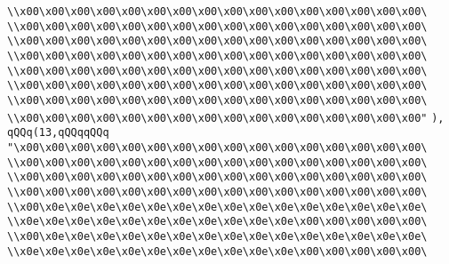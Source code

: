 \verb|\\x00\x00\x00\x00\x00\x00\x00\x00\x00\x00\x00\x00\x00\x00\x00\x00\|\newline
\verb|\\x00\x00\x00\x00\x00\x00\x00\x00\x00\x00\x00\x00\x00\x00\x00\x00\|\newline
\verb|\\x00\x00\x00\x00\x00\x00\x00\x00\x00\x00\x00\x00\x00\x00\x00\x00\|\newline
\verb|\\x00\x00\x00\x00\x00\x00\x00\x00\x00\x00\x00\x00\x00\x00\x00\x00\|\newline
\verb|\\x00\x00\x00\x00\x00\x00\x00\x00\x00\x00\x00\x00\x00\x00\x00\x00\|\newline
\verb|\\x00\x00\x00\x00\x00\x00\x00\x00\x00\x00\x00\x00\x00\x00\x00\x00\|\newline
\verb|\\x00\x00\x00\x00\x00\x00\x00\x00\x00\x00\x00\x00\x00\x00\x00\x00\|\newline
\verb|\\x00\x00\x00\x00\x00\x00\x00\x00\x00\x00\x00\x00\x00\x00\x00\x00"|\newline
\verb|),|\newline
\verb|qQQq(13,qQQqqQQq|\newline
\verb|"\x00\x00\x00\x00\x00\x00\x00\x00\x00\x00\x00\x00\x00\x00\x00\x00\|\newline
\verb|\\x00\x00\x00\x00\x00\x00\x00\x00\x00\x00\x00\x00\x00\x00\x00\x00\|\newline
\verb|\\x00\x00\x00\x00\x00\x00\x00\x00\x00\x00\x00\x00\x00\x00\x00\x00\|\newline
\verb|\\x00\x00\x00\x00\x00\x00\x00\x00\x00\x00\x00\x00\x00\x00\x00\x00\|\newline
\verb|\\x00\x0e\x0e\x0e\x0e\x0e\x0e\x0e\x0e\x0e\x0e\x0e\x0e\x0e\x0e\x0e\|\newline
\verb|\\x0e\x0e\x0e\x0e\x0e\x0e\x0e\x0e\x0e\x0e\x0e\x00\x00\x00\x00\x00\|\newline
\verb|\\x00\x0e\x0e\x0e\x0e\x0e\x0e\x0e\x0e\x0e\x0e\x0e\x0e\x0e\x0e\x0e\|\newline
\verb|\\x0e\x0e\x0e\x0e\x0e\x0e\x0e\x0e\x0e\x0e\x0e\x00\x00\x00\x00\x00\|\newline
